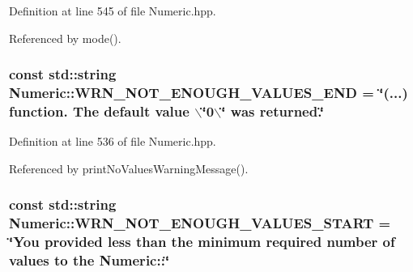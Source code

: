 \-Definition at line 545 of file \-Numeric.\-hpp.



\-Referenced by mode().

\hypertarget{classmultiscale_1_1Numeric_a735efee33b8687c010a03cb1e5e9589c}{
\subsubsection[{\-W\-R\-N\-\_\-\-N\-O\-T\-\_\-\-E\-N\-O\-U\-G\-H\-\_\-\-V\-A\-L\-U\-E\-S\-\_\-\-E\-N\-D}]{\setlength{\rightskip}{0pt plus 5cm}const std\-::string {\bf \-Numeric\-::\-W\-R\-N\-\_\-\-N\-O\-T\-\_\-\-E\-N\-O\-U\-G\-H\-\_\-\-V\-A\-L\-U\-E\-S\-\_\-\-E\-N\-D} = \char`\"{}(...) function. \-The default value $\backslash$\char`\"{}0$\backslash$\char`\"{} was returned.\char`\"{}}}\label{classmultiscale_1_1Numeric_a735efee33b8687c010a03cb1e5e9589c}


\-Definition at line 536 of file \-Numeric.\-hpp.



\-Referenced by print\-No\-Values\-Warning\-Message().

\hypertarget{classmultiscale_1_1Numeric_ab78e644d069f448030e24fecb7c4c8d9}{
\subsubsection[{\-W\-R\-N\-\_\-\-N\-O\-T\-\_\-\-E\-N\-O\-U\-G\-H\-\_\-\-V\-A\-L\-U\-E\-S\-\_\-\-S\-T\-A\-R\-T}]{\setlength{\rightskip}{0pt plus 5cm}const std\-::string {\bf \-Numeric\-::\-W\-R\-N\-\_\-\-N\-O\-T\-\_\-\-E\-N\-O\-U\-G\-H\-\_\-\-V\-A\-L\-U\-E\-S\-\_\-\-S\-T\-A\-R\-T} = \char`\"{}\-You provided less than the {\bf minimum} required number of values to the \-Numeric\-::\char`\"{}}}\label{classmultiscale_1_1Numeric_ab78e644d069f448030e24fecb7c4c8d9}


